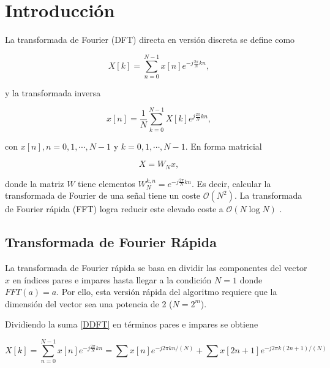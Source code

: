 \documentclass[11pt,a4paper,twoside,pdf]{article}
\numberwithin{equation}{section}
\begin{document}

\tableofcontents


\pagestyle{fancy}
\fancyhead[RO,LE]{\leftmark}
\fancyhead[LO,RE]{\thepage}
\fancyfoot{}



\newpage


\section{Introducción}
\label{intro}


La transformada de Fourier (DFT) directa en versión discreta se define como \cite{angulo2012variable}

\begin{equation}
    X[k] = \sum_{n=0}^{N-1} x[n] e^{-j\frac{2\pi}{N}kn},
\tag{1}
\label{DDFT}
\end{equation}

y la transformada inversa

$$
    x[n] = \frac1N\sum_{k=0}^{N-1} X[k] e^{j\frac{2\pi}{N}kn},
$$


con $x[n], n = 0, 1, \cdots, N-1$ y $k = 0, 1, \cdots, N-1$. En forma matricial

$$
    X = W_N x,
$$

donde la matriz $W$ tiene elementos $W^{k,n}_N = e^{-j\frac{2\pi}{N}kn}$. Es decir, calcular la transformada de Fourier de una señal tiene un coste $\mathcal{O} (N^2)$. La transformada de Fourier rápida (FFT) logra reducir este elevado coste a $\mathcal{O} (N \log N)$ \cite{brigham1988fast}.

\subsection{Transformada de Fourier Rápida}


La transformada de Fourier rápida se basa en dividir las componentes del vector $x$ en índices pares e impares hasta llegar a la condición $N=1$ donde $FFT(a) = a$. Por ello, esta versión rápida del algoritmo requiere que la dimensión del vector sea una potencia de 2 ($N = 2^m$).

Dividiendo la suma \ref{DDFT} en términos pares e impares se obtiene

$$
    X[k] = \sum_{n=0}^{N-1} x[n] e^{-j\frac{2\pi}{N}kn}
    = \sum x[n] e^{-j2\pi kn / (N)} +
    \sum x[2n +1] e^{-j2\pi k (2n +1) / (N)}
$$
\end{document}
